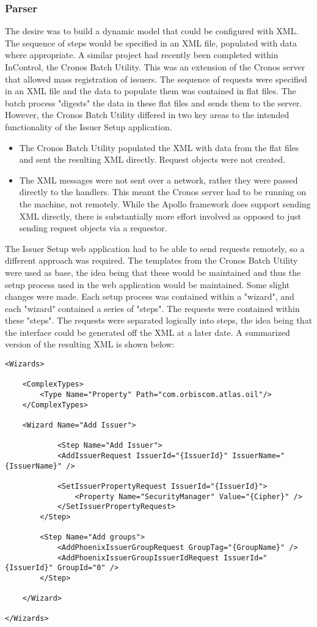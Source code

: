 \documentclass[a4paper, 11pt, titlepage]{article}
\begin{document}
\subsubsection{Parser} 
The desire was to build a dynamic model that could be configured with XML. The sequence of steps would be specified in an XML file, populated with data where appropriate. A similar project had recently been completed within InControl, the Cronos Batch Utility. This was an extension of the Cronos server that allowed mass registration of issuers. The sequence of requests were specified in an XML file and the data to populate them was contained in flat files. The batch process "digests" the data in these flat files and sends them to the server. However, the Cronos Batch Utility differed in two key areas to the intended functionality of the Issuer Setup application. 
\begin{itemize} 
\item The Cronos Batch Utility populated the XML with data from the flat files and sent the resulting XML directly. Request objects were not created. 
\item The XML messages were not sent over a network, rather they were passed directly to the handlers. This meant the Cronos server had to be running on the machine, not remotely. While the Apollo framework does support sending XML directly, there is substantially more effort involved as opposed to just sending request objects via a requestor.  
\end{itemize} 
The Issuer Setup web application had to be able to send requests remotely, so a different approach was required. The templates from the Cronos Batch Utility were used as base, the idea being that these would be maintained and thus the setup process used in the web application would be maintained. Some slight changes were made. Each setup process was contained within a "wizard", and each "wizard" contained a series of "steps". The requests were contained within these "steps". The requests were separated logically into steps, the idea being that the interface could be generated off the XML at a later date. A summarized version of the resulting XML is shown below: 
\begin{verbatim} 
<Wizards> 
 
    <ComplexTypes> 
        <Type Name="Property" Path="com.orbiscom.atlas.oil"/> 
    </ComplexTypes> 
 
    <Wizard Name="Add Issuer"> 
 
            <Step Name="Add Issuer"> 
            <AddIssuerRequest IssuerId="{IssuerId}" IssuerName="{IssuerName}" /> 
 
            <SetIssuerPropertyRequest IssuerId="{IssuerId}"> 
                <Property Name="SecurityManager" Value="{Cipher}" /> 
            </SetIssuerPropertyRequest> 
        </Step> 
		 
        <Step Name="Add groups"> 
            <AddPhoenixIssuerGroupRequest GroupTag="{GroupName}" /> 
            <AddPhoenixIssuerGroupIssuerIdRequest IssuerId="{IssuerId}" GroupId="0" />	 
        </Step> 
	 
    </Wizard> 
 
</Wizards> 
\end{verbatim} 
 
\end{document}
